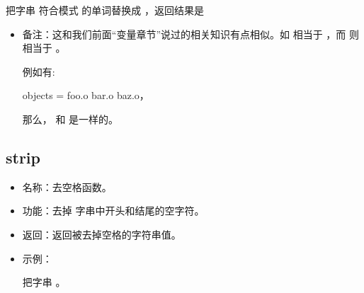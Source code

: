\documentclass[a4paper,10pt]{sphinxmanual}
\begin{document}
把字串  符合模式  的单词替换成  ，返回结果是
\begin{itemize}
\item {} 
备注：这和我们前面“变量章节”说过的相关知识有点相似。如
 相当于
 ，而
 则相当于
 。

例如有:

\begin{sphinxVerbatim}[commandchars=\\\{\}]
objects = foo.o bar.o baz.o，
\end{sphinxVerbatim}

那么，  和  是一样的。

\end{itemize}


\subsection{strip}
\label{\detokenize{functions:strip}}
\begin{sphinxVerbatim}[commandchars=\\\{\}]
 \PYGZlt{}\PYGZgt{}
\end{sphinxVerbatim}
\begin{itemize}
\item {} 
名称：去空格函数。

\item {} 
功能：去掉  字串中开头和结尾的空字符。

\item {} 
返回：返回被去掉空格的字符串值。

\item {} 
示例：
\begin{quote}

\begin{sphinxVerbatim}[commandchars=\\\{\}]
    
\end{sphinxVerbatim}
\end{quote}

把字串  。

\end{itemize}
\end{document}
